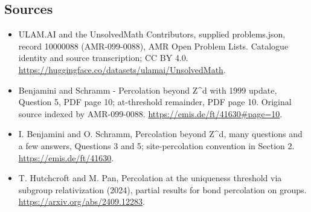 \documentclass[11pt,a4paper]{article}
\begin{document}
\subsection{Sources}
\begin{itemize}
\item[S1] ULAM.AI and the UnsolvedMath Contributors, supplied problems.json, record 10000088 (AMR-099-0088), AMR Open Problem Lists. Catalogue identity and source transcription; CC BY 4.0.
\url{https://huggingface.co/datasets/ulamai/UnsolvedMath}.
\item[S2] Benjamini and Schramm - Percolation beyond Z\textasciicircum{}d with 1999 update, Question 5, PDF page 10; at-threshold remainder, PDF page 10. Original source indexed by AMR-099-0088.
\url{https://emis.de/ft/41630#page=10}.
\item[S3] I. Benjamini and O. Schramm, Percolation beyond Z\textasciicircum{}d, many questions and a few answers, Questions 3 and 5; site-percolation convention in Section 2.
\url{https://emis.de/ft/41630}.
\item[S4] T. Hutchcroft and M. Pan, Percolation at the uniqueness threshold via subgroup relativization (2024), partial results for bond percolation on groups.
\url{https://arxiv.org/abs/2409.12283}.
\end{itemize}
\end{document}

